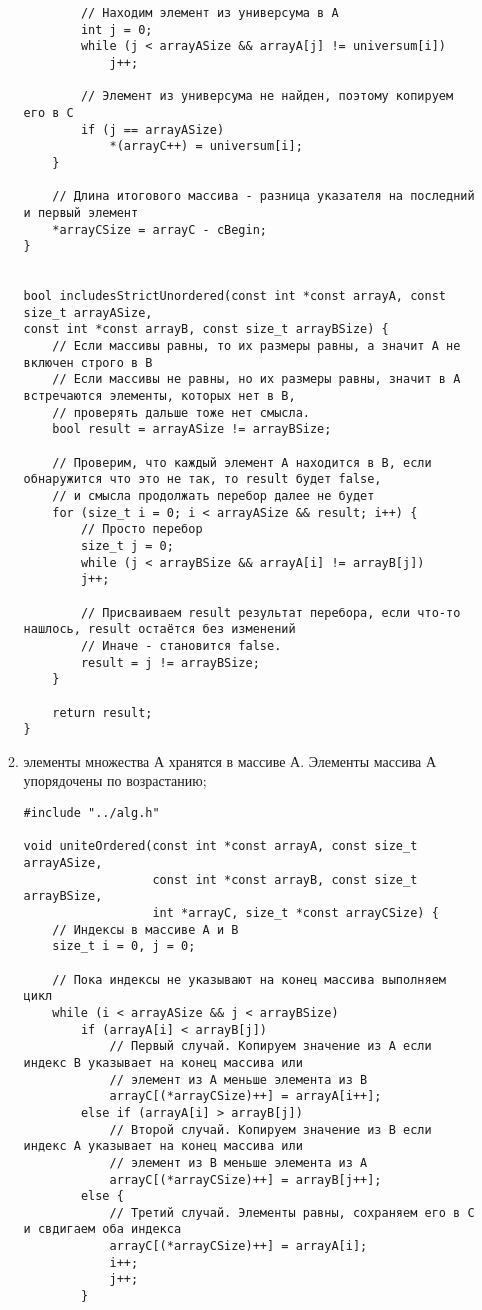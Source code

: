 \documentclass[a4paper,14pt]{extarticle}
\begin{document}
\begin{enumerate}[№1. ]
\begin{enumerate}[label=\asbuk*),ref=\asbuk*]
\begin{verbatim}
        // Находим элемент из универсума в A
        int j = 0;
        while (j < arrayASize && arrayA[j] != universum[i])
            j++;

        // Элемент из универсума не найден, поэтому копируем его в C
        if (j == arrayASize)
            *(arrayC++) = universum[i];
    }

    // Длина итогового массива - разница указателя на последний и первый элемент
    *arrayCSize = arrayC - cBegin;
}


bool includesStrictUnordered(const int *const arrayA, const size_t arrayASize,
const int *const arrayB, const size_t arrayBSize) {
	// Если массивы равны, то их размеры равны, а значит A не включен строго в B
	// Если массивы не равны, но их размеры равны, значит в A встречаются элементы, которых нет в B,
	// проверять дальше тоже нет смысла.
	bool result = arrayASize != arrayBSize;
	
	// Проверим, что каждый элемент A находится в B, если обнаружится что это не так, то result будет false,
	// и смысла продолжать перебор далее не будет
	for (size_t i = 0; i < arrayASize && result; i++) {
		// Просто перебор
		size_t j = 0;
		while (j < arrayBSize && arrayA[i] != arrayB[j])
		j++;
		
		// Присваиваем result результат перебора, если что-то нашлось, result остаётся без изменений
		// Иначе - становится false.
		result = j != arrayBSize;
	}
	
	return result;
}
			\end{verbatim}
		
			\item элементы множества А хранятся в массиве А. Элементы массива А упорядочены по возрастанию;
			\begin{verbatim}
#include "../alg.h"

void uniteOrdered(const int *const arrayA, const size_t arrayASize,
                  const int *const arrayB, const size_t arrayBSize,
                  int *arrayC, size_t *const arrayCSize) {
    // Индексы в массиве A и B
    size_t i = 0, j = 0;

    // Пока индексы не указывают на конец массива выполняем цикл
    while (i < arrayASize && j < arrayBSize)
        if (arrayA[i] < arrayB[j])
            // Первый случай. Копируем значение из A если индекс B указывает на конец массива или
            // элемент из A меньше элемента из B
            arrayC[(*arrayCSize)++] = arrayA[i++];
        else if (arrayA[i] > arrayB[j])
            // Второй случай. Копируем значение из B если индекс A указывает на конец массива или
            // элемент из B меньше элемента из A
            arrayC[(*arrayCSize)++] = arrayB[j++];
        else {
            // Третий случай. Элементы равны, сохраняем его в С и свдигаем оба индекса
            arrayC[(*arrayCSize)++] = arrayA[i];
            i++;
            j++;
        }


\end{verbatim}
\end{enumerate}
\end{enumerate}
\end{document}
